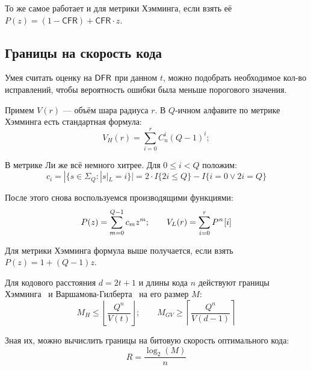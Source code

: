 \begin{remark}
	То же самое работает и для метрики Хэмминга, если взять её $P(z) = (1-\mathsf{CFR})+\mathsf{CFR}\cdot z$.
\end{remark}

\subsection{Границы на скорость кода}

Умея считать оценку на $\mathsf{DFR}$ при данном $t$, можно подобрать необходимое кол-во исправлений, чтобы вероятность ошибки была меньше порогового значения.

Примем $V(r)$ --- объём шара радиуса $r$. В $Q$-ичном алфавите по метрике Хэмминга есть стандартная формула:
\begin{equation}
	V_H(r) = \sum_{i=0}^{r}{C_n^i(Q-1)^i};
\end{equation}

В метрике Ли же всё немного хитрее.  Для $0 \leq i < Q$ положим:
\begin{equation}
	c_i = |\{s \in \Sigma_Q \colon |s|_L = i\}| = 2\cdot I\{2i \leq Q\}-I\{i = 0 \vee 2i = Q\}
\end{equation}

После этого снова воспользуемся производящими функциями:
\begin{equation}
	P(z) = \sum_{m=0}^{Q-1}{c_mz^m}; \qquad V_L(r) = \sum_{i=0}^r{P^{\:\!n}\:\![i]}
\end{equation}

\begin{remark}
	Для метрики Хэмминга формула выше получается, если взять $P(z) = 1+(Q-1)z$.
\end{remark}

\begin{state}\label{st:bounds}
	Для кодового расстояния $d = 2t+1$ и длины кода $n$ действуют границы Хэмминга~\cite{Hamming} и Варшамова-Гилберта~\cite{Gilbert_bound,Varshamov_bound} на его размер $M$:
	\begin{equation}
		M_H \leq \left\lfloor\frac{Q^n}{V(t)}\right\rfloor; \qquad M_{GV} \geq \left\lceil\frac{Q^n}{V(d-1)}\right\rceil
	\end{equation}
	
	Зная их, можно вычислить границы на битовую скорость оптимального кода:
	\begin{equation}
		R = \frac{\log_2(M)}n
	\end{equation}	
\end{state}
